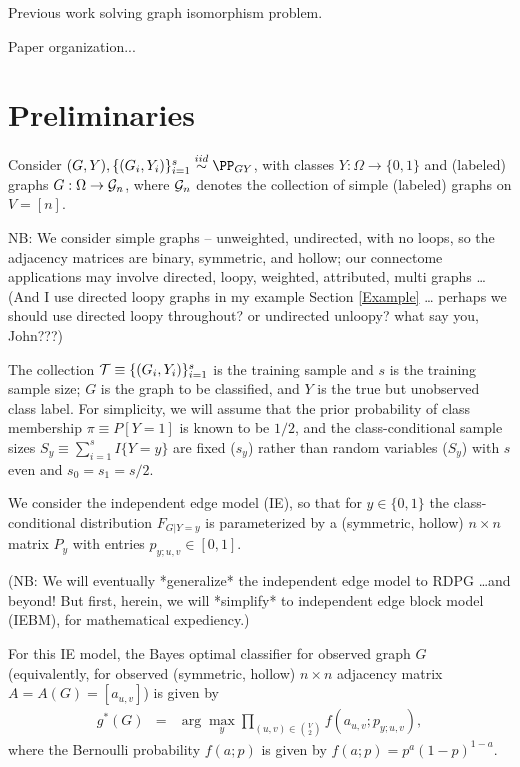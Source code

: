 Previous work solving graph isomorphism problem.

Paper organization...

\section{Preliminaries} %
\label{sec:preliminaries}



Consider $(G,Y),\{(G_i,Y_i)\}_{i=1}^s \overset{iid}{\sim} \PP_{GY}$,
with classes $Y:\Omega \rightarrow \{0,1\}$ and
(labeled) graphs $G:\Omega \rightarrow \mathcal{G}_n$,
where $\mathcal{G}_n$ denotes the collection of simple (labeled) graphs on $V=[n]$.

NB:
We consider simple graphs -- unweighted, undirected, with no loops,
so the adjacency matrices are binary, symmetric, and hollow;
our connectome applications
may involve {directed, loopy, weighted, attributed, multi} graphs \ldots
(And I use directed loopy graphs in my example Section \ref{Example} \dots
perhaps we should use directed loopy throughout? or undirected unloopy? what say you, John???)

The collection
$\mathcal{T} \equiv \{(G_i,Y_i)\}_{i=1}^s$ is the training sample
and $s$ is the training sample size;
$G$ is the graph to be classified,
and $Y$ is the true but unobserved class label.
For simplicity, we will assume that the prior probability of class membership
$\pi \equiv P[Y=1]$ is known to be $1/2$,
and the class-conditional sample sizes $S_y \equiv \sum_{i=1}^s I\{Y=y\}$
are fixed ($s_y$) rather than random variables ($S_y$)
with $s$ even and $s_0=s_1=s/2$.

We consider the independent edge model (IE),
so that for $y \in \{0,1\}$ the class-conditional distribution $F_{G|Y=y}$
is parameterized by a (symmetric, hollow)
$n \times n$ matrix $P_y$ with entries $p_{y;u,v} \in [0,1]$.

(NB: We will eventually *generalize* the independent edge model to RDPG \ldots and beyond!
But first, herein, we will *simplify* to independent edge block model (IEBM), for mathematical expediency.)

For this IE model, the Bayes optimal classifier for observed graph $G$
(equivalently, for observed (symmetric, hollow) $n \times n$ adjacency matrix $A=A(G)=[a_{u,v}]$)
is given by
\begin{eqnarray}
g^*(G) &=& \arg\max_y \prod_{(u,v) \in {V \choose 2}} f(a_{u,v};p_{y;u,v}),
\end{eqnarray}
where the Bernoulli probability $f(a;p)$ is given by
$f(a;p) = p^{a} (1-p)^{1-a}$.

